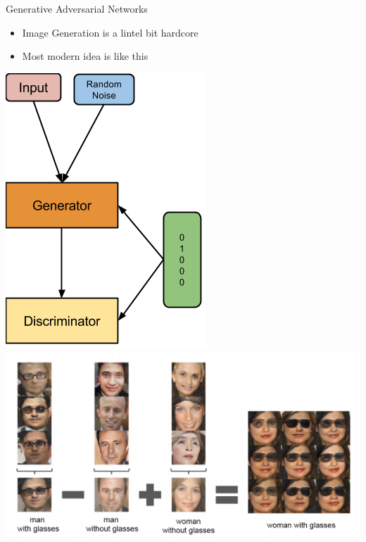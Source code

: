 \documentclass{beamer}
\begin{document}
\begin{frame}{Generative Adversarial Networks}
	\begin{itemize}
		\pause\item Image Generation is a lintel bit hardcore
		\pause\item Most modern idea is like this
	\end{itemize}
	\begin{center}
		\pause\includegraphics[scale=0.3]{img/gan2}
		\pause\includegraphics[scale=0.4]{img/gan1}
	\end{center}
\end{frame}
\end{document}
